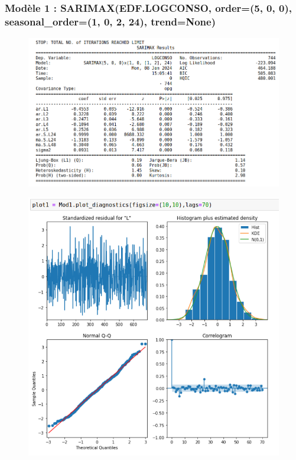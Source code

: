 \documentclass{beamer}
\theoremstyle{definition}
\begin{document}
\begin{frame}
	\frametitle{Modèle 1 : SARIMAX(EDF.LOGCONSO, order=(5, 0, 0), seasonal\_order=(1, 0, 2, 24), trend=None)}
	\begin{minipage}[t]{1\linewidth}
		\centering
		\begin{minipage}[c]{0.55\linewidth}\centering\begin{figure}
				\centering
				\includegraphics[width=1\linewidth]{16.png}	
		\end{figure}\end{minipage}\hfill 
		\begin{minipage}[c]{0.44\linewidth}\centering\begin{figure}
				\begin{center}
					\includegraphics[width=1\linewidth]{17.png}			
				\end{center}
				
		\end{figure}\end{minipage}
	\end{minipage}	
\end{frame}
\end{document}
